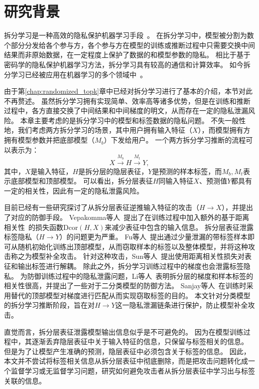 \section{研究背景}
拆分学习是一种高效的隐私保护机器学习手段~\cite{vepakomma2018split,poirot2019split}。
在拆分学习中，模型被分割为数个部分分发给各个参与方，各个参与方在模型的训练或推断过程中只需要交换中间结果而非原始数据，在一定程度上保护了数据的和模型参数的隐私。
%
相比于基于密码学的隐私保护机器学习方法，拆分学习具有较高的通信和计算效率。
%
如今拆分学习已经被应用在机器学习的多个领域中~\cite{palanisamy2021spliteasy,fagbohungbe2022split_edge_image,ccc2022vfgnn}。

由于第\ref{chap:randomized_topk}章中已经对拆分学习进行了基本的介绍，本节对此不再赘述。
%
虽然拆分学习拥有实现简单、效率高等诸多优势，但是在训练和推断过程中，各方直接交换了中间结果和中间梯度的明文，从而存在一定的隐私泄漏风险。
%
本章主要考虑的是拆分学习中的模型和标签数据的隐私问题。
%
不失一般性地，我们考虑两方拆分学习的场景，其中用户拥有输入特征（$X$），而模型拥有方拥有模型参数并把底部模型（$M_b$）下发给用户。
一个两方拆分学习推断的流程可以表示为：
\begin{equation}
    X \stackrel{M_b}{\to} H \stackrel{M_t}{\to} Y,
\end{equation}
其中，$X$是输入特征，$H$是拆分层的隐层表征，$Y$是预测的样本标签，而$M_b, M_t$表示底部模型和顶部模型。
%
可以看出，拆分层表征$H$同输入特征$X$、预测值$Y$都具有一定的相关性，因此有一定的隐私泄露风险。


目前已经有一些研究探讨了从拆分层表征逆推输入特征的攻击（$H\to X$），并提出了对应的防御手段。
Vepakomma等人~\cite{vepakomma2020nopeek}提出了在训练过程中加入额外的基于距离相关性~\cite{szekely2007dcor}的损失函数$\text{Dcor}(H, X)$来减少表征中包含的输入信息。
%
拆分层表征泄露标签隐私（$H \to Y$）的问题更为严重。
%
Fu等人~\cite{fucong2022label_infer_attack}提出通过少量泄漏的带标签样本即可从随机初始化训练出顶部模型，从而窃取样本的标签以及整体模型，并将这种攻击称之为模型补全攻击。
%
针对这种攻击，Sun等人~\cite{sunjiankai2022forward_embedding_protect}提出使用距离相关性损失对表征和输出标签进行解耦。
%
除此之外，拆分学习训练过程中的梯度也会泄露标签隐私。
为防御训练过程中的隐私泄露问题，Li等人~\cite{oscarli2022label_defense_marvell}表明拆分层的梯度和样本标签的相关性很高，并提出了一些对于二分类模型的防御方法。
Sanjay等人~\cite{sanjay2023exploit_split_learning}在训练时采用替代的顶部模型对梯度进行匹配从而实现窃取标签的目的。
%
本文针对分类模型的拆分学习推断阶段，旨在对$H\to Y$这一隐私泄漏链条进行保护，防止模型补全攻击。

直觉而言，拆分层表征泄露模型输出信息似乎是不可避免的。
%
因为在模型训练过程中，其逐渐丢弃隐层表征中关于输入特征的信息，只保留与标签相关的信息。
但是为了让模型产生准确的预测，隐层表征中必须包含关于标签的信息。
%
因此，本文并不尝试将标签相关信息从拆分层表征中彻底删除，而是把攻击问题转化成一个监督学习或无监督学习问题，研究如何避免攻击者从拆分层表征中学习出与标签关联的信息。
%
